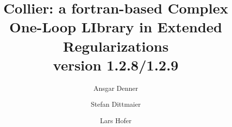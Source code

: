 \documentclass[preprint,sort&compress,12pt]{elsarticle}
\newcommand{\collier}{{\sc Collier}}
\begin{document}
\begin{frontmatter}



\title{\collier: {a fortran-based  Complex One-Loop LIbrary in
  Extended Regularizations}\\
  version 1.2.8/1.2.9}


\author[ad]{Ansgar Denner}

\author[sd]{Stefan Dittmaier}

\author[lh]{Lars Hofer}


\address[ad]{Universit\"at W\"urzburg, 
Institut f\"ur Theoretische Physik und Astrophysik, \\
D-97074 W\"urzburg, Germany}
\address[sd]{Albert-Ludwigs-Universit\"at Freiburg, Physikalisches Institut, 
\\ D-79104 Freiburg, Germany}
\address[lh]{Department de F\'isica Qu\`antica i Astrof\'isica (FQA), \\
Institut de Ci\`encies del Cosmos (ICCUB), \\
Universitat de Barcelona (UB),
Mart\'i Franqu\`es 1, \\
E-08028 Barcelona, Spain}


\end{frontmatter}
\end{document}
